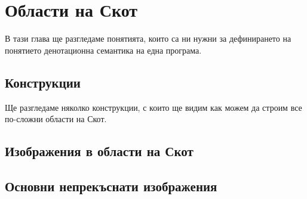 \chapter{Области на Скот}


В тази глава ще разгледаме понятията, които са ни нужни за дефинирането на понятието денотационна семантика на една програма.



\section{Конструкции}

Ще разгледаме няколко конструкции, с които ще видим как можем да строим все по-сложни области на Скот.





\section{Изображения в области на Скот}









\section{Основни непрекъснати изображения}











% 



% 

% 


% 



% 
% 

\newpage
% 
% 

% 
